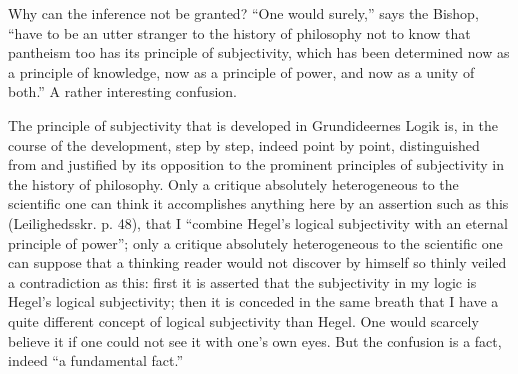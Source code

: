 \documentclass[12pt]{book}
\newcommand{\opage}[1]{\marginnote{\footnotesize\textit{[#1]}}}
\begin{document}
Why can the inference not be granted? ``One would surely,'' says the Bishop, ``have to be an utter stranger to the history of philosophy not to know that pantheism too has its principle of subjectivity, which has been determined now as a principle of knowledge, now as a principle of power, and now as a unity of both.'' A rather interesting confusion.

The principle of subjectivity that is developed in Grundideernes Logik is, in the course of the development, step by step, indeed point by point, distinguished from and justified by its opposition to the prominent principles of subjectivity in the history of philosophy. Only a critique absolutely heterogeneous to the scientific one can think it accomplishes anything here by an assertion such as this (Leilighedsskr. p. 48), that I ``combine Hegel's logical subjectivity with an eternal principle of power''; only a critique absolutely heterogeneous to the scientific one can suppose that a thinking reader would not discover by himself so thinly veiled a contradiction as this: first it is asserted that the subjectivity in my logic is Hegel's logical subjectivity; then it is conceded in the same breath that I have a quite different concept of logical subjectivity than Hegel. One would scarcely believe it if one could not see it with
\opage{120}\setcounter{footnote}{0}%
one's own eyes. But the confusion is a fact, indeed ``a fundamental fact.''
\end{document}
